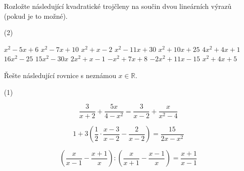 \documentclass[12pt,a4paper]{article}
\begin{document}
\begin{exercise}
Rozložte následující kvadratické trojčleny na součin dvou lineárních výrazů (pokud je to možné).

\begin{tasks}(2)

  \task \(x^2 - 5x + 6\)
  \task \(x^2 - 7x + 10\)
  \task \(x^2 + x - 2\)
  \task \(x^2 - 11x + 30\)
  \task \(x^2 + 10x + 25\)
  \task \(4x^2 + 4x + 1\)
  \task \(16x^2 - 25\)
  \task \(15x^2 - 30x\)
  \task \(2x^2 + x - 1\)
  \task \(-x^2 + 7x + 8\)
  \task \(-2x^2 + 11x - 15\)
  \task \(x^2 + 4x + 5\)

\end{tasks}

\end{exercise}


\begin{exercise}
Řešte následující rovnice s neznámou \(x \in \mathbb{R}\).

\begin{tasks}(1)

  \task 
  \[
  \frac{3}{x+2} + \frac{5x}{4 - x^2} = \frac{3}{x-2} + \frac{x}{x^2 - 4}
  \]

  \task
  \[
  1 + 3\left( \frac12 \cdot \frac{x-3}{x-2} - \frac{2}{x-2} \right) = \frac{15}{2x - x^2}
  \]

  \task
  \[
  \left( \frac{x}{x-1} - \frac{x+1}{x} \right) : \left( \frac{x}{x+1} - \frac{x-1}{x} \right) = \frac{x+1}{x-1}
  \]

\end{tasks}

\end{exercise}
\end{document}

